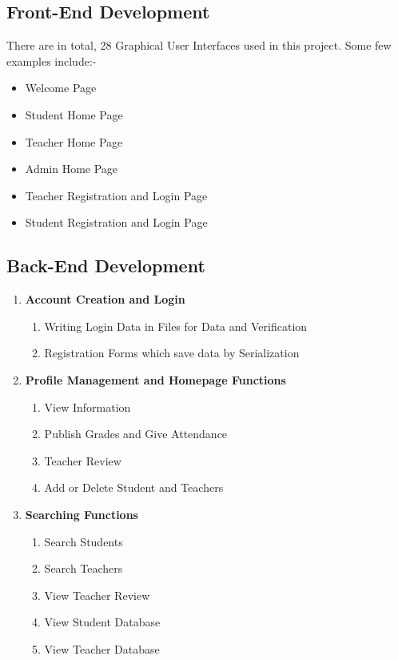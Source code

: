 \documentclass[a4paper,12pt]{article}
\begin{document}
\subsection{Front-End Development}
\enlargethispage{\baselineskip}
There are in total, 28 Graphical User Interfaces used in this project. Some few examples include:-
\begin{itemize}
    \item Welcome Page
    \item Student Home Page
    \item Teacher Home Page
    \item Admin Home Page
    \item Teacher Registration and Login Page
    \item Student Registration and Login Page
\end{itemize}
\newpage

\subsection{Back-End Development}
\enlargethispage{\baselineskip}
\begin{enumerate}
   
   \item \textbf{Account Creation and Login}
    \begin{enumerate}
        \item Writing Login Data in Files for Data and Verification
        \item Registration Forms which save data by Serialization    
    \end{enumerate}
   
   \item \textbf{Profile Management and Homepage Functions}
    \begin{enumerate}
        \item View Information
        \item Publish Grades and Give Attendance
        \item Teacher Review 
        \item Add or Delete Student and Teachers
    \end{enumerate}
   
   \item \textbf{Searching Functions}
    \begin{enumerate}
        \item Search Students
        \item Search Teachers
        \item View Teacher Review
        \item View Student Database
        \item View Teacher Database
    \end{enumerate}

\end{enumerate}
\end{document}
